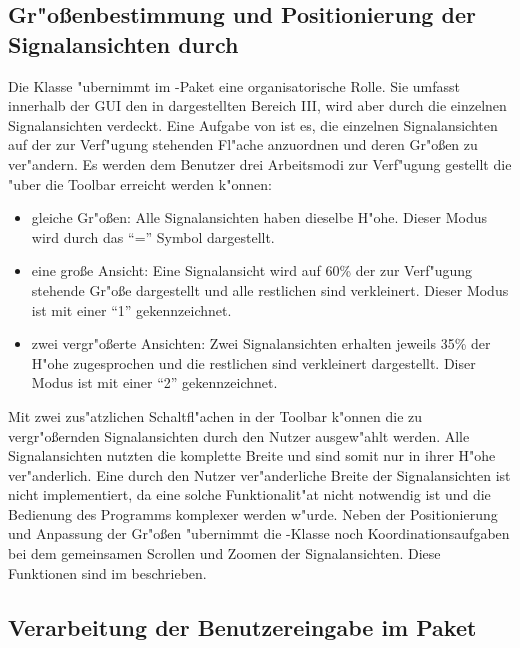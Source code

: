 \subsection{Gr"o{\ss}enbestimmung und Positionierung der Signalansichten durch }
\label{sec:signalpanel_organisation}

Die Klasse  "ubernimmt im -Paket eine organisatorische Rolle.
Sie umfasst innerhalb der \ac{GUI} den in  dargestellten Bereich III, wird aber durch die einzelnen Signalansichten verdeckt.
Eine Aufgabe von  ist es, die einzelnen Signalansichten auf der zur Verf"ugung stehenden Fl"ache anzuordnen und deren Gr"o{\ss}en zu ver"andern.
Es werden dem Benutzer drei Arbeitsmodi zur Verf"ugung gestellt die "uber die Toolbar erreicht werden k"onnen:
\begin{itemize}
	\item gleiche Gr"o{\ss}en: Alle Signalansichten haben dieselbe H"ohe. Dieser Modus wird durch das "`="' Symbol dargestellt.
	\item eine gro{\ss}e Ansicht: Eine Signalansicht wird auf \unit{60}{\%} der zur Verf"ugung stehende Gr"o{\ss}e dargestellt und alle restlichen sind verkleinert. Dieser Modus ist mit einer "`1"' gekennzeichnet.
	\item zwei vergr"o{\ss}erte Ansichten: Zwei Signalansichten erhalten jeweils \unit{35}{\%} der H"ohe zugesprochen und die restlichen sind verkleinert dargestellt. Diser Modus ist mit einer "`2"' gekennzeichnet.
\end{itemize}
Mit zwei zus"atzlichen Schaltfl"achen in der Toolbar k"onnen die zu vergr"o{\ss}ernden Signalansichten durch den Nutzer ausgew"ahlt werden.
Alle Signalansichten nutzten die komplette Breite und sind somit nur in ihrer H"ohe ver"anderlich.
Eine durch den Nutzer ver"anderliche Breite der Signalansichten ist nicht implementiert, da eine solche Funktionalit"at nicht notwendig ist und die Bedienung des Programms komplexer werden w"urde.
Neben der Positionierung und Anpassung der Gr"o{\ss}en "ubernimmt die -Klasse noch Koordinationsaufgaben bei dem gemeinsamen Scrollen und Zoomen der Signalansichten.
Diese Funktionen sind im  beschrieben.


\subsection{Verarbeitung der Benutzereingabe im Paket }
\label{sec:userinput}

